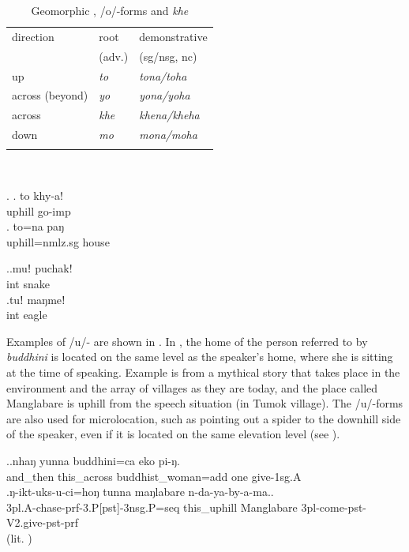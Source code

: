 \begin{table}[htp]
\begin{centering}
\begin{tabular}{lll}
\lsptoprule
 {\sc direction} & {\sc root } & {\sc demonstrative} \\
  &(adv.) & ({\sc sg/nsg, nc})\\
\midrule
{\sc up}&\emph{to} &\emph{tona/toha} \\
{\sc across (beyond)}&\emph{yo} &\emph{yona/yoha} \\
{\sc across }&\emph{khe}&\emph{khena/kheha} \\
{\sc down}&\emph{mo} &\emph{mona/moha} \\
\lspbottomrule
\end{tabular}\\
\caption{Geomorphic ,  /o/-forms and  \emph{khe} }\label{motoyo}
\end{centering}
\end{table}


\ex. \ag. to khy-a!\\
uphill go{\sc -imp}\\
\bg. to=na paŋ\\
uphill{\sc =nmlz.sg} house\\


\ex.\ag.muǃ puchak!\\
{\sc int} snake\\
\bg.tuǃ maŋmeǃ\\
{\sc int} eagle\\


Examples of /u/- are shown in \Next.  In \Next[a], the home of the person referred to by \emph{buddhini} is located on the same level as the speaker's home, where she is sitting at the time of speaking. Example \Next[b] is from a mythical story that takes place in the environment and the array of villages as they are today, and the place called Manglabare is uphill from the speech situation (in Tumok village). The /u/-forms are also used for microlocation, such as pointing out a spider to the downhill side of the speaker, even if it is located on the same elevation level (see ).

\ex.\ag.nhaŋ    yunna              buddhini=ca        eko pi-ŋ.\\
and\_then this\_across buddhist\_woman{\sc =add} one give{\sc [pst]-1sg.A}\\
\bg.ŋ-ikt-uks-u-ci=hoŋ   tunna    maŋlabare n-da-ya-by-a-ma..\\
{\sc 3pl.A-}chase{\sc -prf-3.P[pst]-3nsg.P=seq} this\_uphill Manglabare {\sc 3pl-}come{\sc -pst-V2.give-pst-prf}\\
 (lit. ) 	



